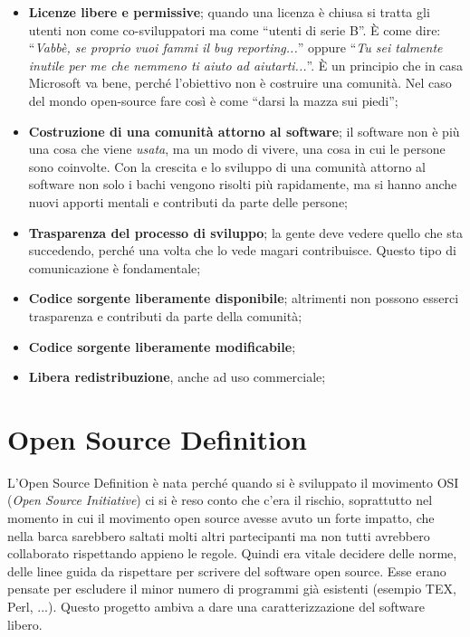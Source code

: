 \begin{itemize}

\item \textbf{Licenze libere e permissive}; quando una licenza è chiusa si tratta gli utenti non come co-sviluppatori ma come ``utenti di serie B''. È come dire: ``\textit{Vabbè, se proprio vuoi fammi il bug reporting...}'' oppure ``\textit{Tu sei talmente inutile per me che nemmeno ti aiuto ad aiutarti...}''. È un principio che in casa Microsoft va bene, perché l'obiettivo non è costruire una comunità. Nel caso del mondo open-source fare così è come ``darsi la mazza sui piedi'';
\item \textbf{Costruzione di una comunità attorno al software}; il software non è più una cosa che viene \textit{usata}, ma un modo di vivere, una cosa in cui le persone sono coinvolte. Con la crescita e lo sviluppo di una comunità attorno al software non solo i bachi vengono risolti più rapidamente, ma si hanno anche nuovi apporti mentali e contributi da parte delle persone;
\item \textbf{Trasparenza del processo di sviluppo}; la gente deve vedere quello che sta succedendo, perché una volta che lo vede magari contribuisce. Questo tipo di comunicazione è fondamentale;
\item \textbf{Codice sorgente liberamente disponibile}; altrimenti non possono esserci trasparenza e contributi da parte della comunità;
\item \textbf{Codice sorgente liberamente modificabile};
\item \textbf{Libera redistribuzione}, anche ad uso commerciale;

\end{itemize}

\section{Open Source Definition}

L'Open Source Definition è nata perché quando si è sviluppato il movimento OSI (\textit{Open Source Initiative}) ci si è reso conto che c'era il rischio, soprattutto nel momento in cui il movimento open source avesse avuto un forte impatto, che nella barca sarebbero saltati molti altri partecipanti ma non tutti avrebbero collaborato rispettando appieno le regole. Quindi era vitale decidere delle norme, delle linee guida da rispettare per scrivere del software open source. Esse erano pensate per escludere il minor numero di programmi già esistenti (esempio TEX, Perl, ...). Questo progetto ambiva a dare una caratterizzazione del software libero.

